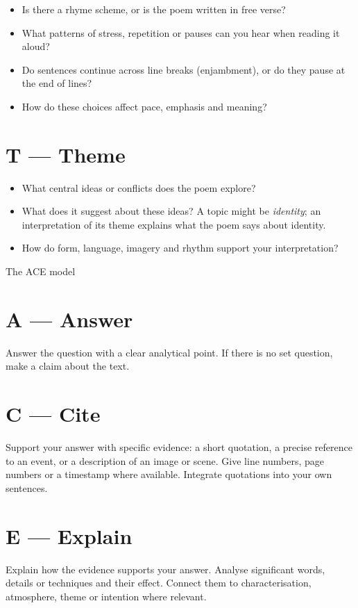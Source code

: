 \documentclass[11pt,a4paper,oneside]{book}
\begin{document}
\begin{itemize}
\item Is there a rhyme scheme, or is the poem written in free verse?
\item What patterns of stress, repetition or pauses can you hear when reading it aloud?
\item Do sentences continue across line breaks (enjambment), or do they pause at the end of lines?
\item How do these choices affect pace, emphasis and meaning?
\end{itemize}

\section*{T — Theme}

\begin{itemize}
\item What central ideas or conflicts does the poem explore?
\item What does it suggest about these ideas? A topic might be \emph{identity}; an interpretation of its theme explains what the poem says about identity.
\item How do form, language, imagery and rhythm support your interpretation?
\end{itemize}

\clearpage{}\label{note-ace-model}
{\displayfont\color{navy}\fontsize{30}{34}\selectfont The ACE model\par}\vspace{4mm}

\section*{A — Answer}
Answer the question with a clear analytical point. If there is no set question, make a claim about the text.


\section*{C — Cite}
Support your answer with specific evidence: a short quotation, a precise reference to an event, or a description of an image or scene. Give line numbers, page numbers or a timestamp where available. Integrate quotations into your own sentences.


\section*{E — Explain}
Explain how the evidence supports your answer. Analyse significant words, details or techniques and their effect. Connect them to characterisation, atmosphere, theme or intention where relevant.
\end{document}

